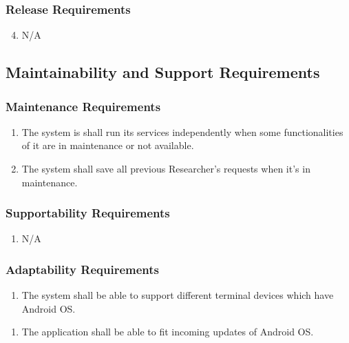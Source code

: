 \documentclass[]{article}
\begin{document}
\subsubsection{Release Requirements}
\label{ssub:release_requirements}
\begin{enumerate}[{OE}1.]
	\setcounter{enumi}{3}
	\item N/A
\end{enumerate}


\subsection{Maintainability and Support Requirements}
\label{sub:maintainability_and_support_requirements}

\subsubsection{Maintenance Requirements}
\label{ssub:maintenance_requirements}
\begin{enumerate}[{MS}1.]
	\item The system is {\color{red}shall} run its services independently when some functionalities of it are in maintenance or not available.
	\item The system {\color{red}shall} save all previous Researcher's requests when it's in maintenance.
\end{enumerate}

\subsubsection{Supportability Requirements}
\label{ssub:supportability_requirements}
\begin{enumerate}[{MS}3.]
	\item {\color{red}N/A}
\end{enumerate}

\subsubsection{Adaptability Requirements}
\label{ssub:adaptability_requirements}
	\begin{enumerate}[{MS}4.]
	\item The system {\color{red}shall be able to} support different terminal devices which have Android OS.
	\end{enumerate}
	\begin{enumerate}[{MS}5.]
	\item The application {\color{red}shall be} able to fit incoming updates of Android OS.
\end{enumerate}
\end{document}
